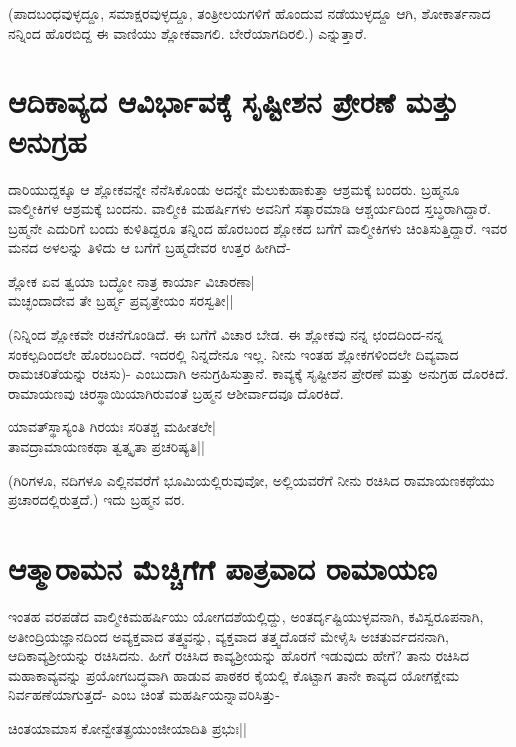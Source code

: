 (ಪಾದಬಂಧವುಳ್ಳದ್ದೂ, ಸಮಾಕ್ಷರವುಳ್ಳದ್ದೂ, ತಂತ್ರೀಲಯಗಳಿಗೆ ಹೊಂದುವ ನಡೆಯುಳ್ಳದ್ದೂ ಆಗಿ, ಶೋಕಾರ್ತನಾದ ನನ್ನಿಂದ ಹೊರಬಿದ್ದ ಈ ವಾಣಿಯು ಶ್ಲೋಕವಾಗಲಿ. ಬೇರೆಯಾಗದಿರಲಿ.) ಎನ್ನುತ್ತಾರೆ. 

\section*{ಆದಿಕಾವ್ಯದ ಆವಿರ್ಭಾವಕ್ಕೆ ಸೃಷ್ಟೀಶನ ಪ್ರೇರಣೆ ಮತ್ತು ಅನುಗ್ರಹ} 

ದಾರಿಯುದ್ದಕ್ಕೂ ಆ ಶ್ಲೋಕವನ್ನೇ ನೆನೆಸಿಕೊಂಡು ಅದನ್ನೇ ಮೆಲುಕುಹಾಕುತ್ತಾ ಆಶ್ರಮಕ್ಕೆ ಬಂದರು. ಬ್ರಹ್ಮನೂ ವಾಲ್ಮೀಕಿಗಳ ಆಶ್ರಮಕ್ಕೆ ಬಂದನು. ವಾಲ್ಮೀಕಿ ಮಹರ್ಷಿಗಳು ಅವನಿಗೆ ಸತ್ಕಾರಮಾಡಿ ಆಶ್ಚರ್ಯದಿಂದ ಸ್ತಬ್ಧರಾಗಿದ್ದಾರೆ. ಬ್ರಹ್ಮನೇ ಎದುರಿಗೆ ಬಂದು ಕುಳಿತಿದ್ದರೂ ತನ್ನಿಂದ ಹೊರಬಂದ ಶ್ಲೋಕದ ಬಗೆಗೆ ವಾಲ್ಮೀಕಿಗಳು ಚಿಂತಿಸುತ್ತಿದ್ದಾರೆ. ಇವರ ಮನದ ಅಳಲನ್ನು ತಿಳಿದು ಆ ಬಗೆಗೆ ಬ್ರಹ್ಮದೇವರ ಉತ್ತರ ಹೀಗಿದೆ- 

\begin{shloka} 
ಶ್ಲೋಕ ಏವ ತ್ವಯಾ ಬದ್ಧೋ ನಾತ್ರ ಕಾರ್ಯಾ ವಿಚಾರಣಾ|\\ 
ಮಚ್ಛಂದಾದೇವ ತೇ ಬ್ರರ್ಹ್ಮ ಪ್ರವೃತ್ತೇಯಂ ಸರಸ್ವತೀ||
\end{shloka} 

(ನಿನ್ನಿಂದ ಶ್ಲೋಕವೇ ರಚನೆಗೊಂಡಿದೆ. ಈ ಬಗೆಗೆ ವಿಚಾರ ಬೇಡ. ಈ ಶ್ಲೋಕವು ನನ್ನ ಛಂದದಿಂದ-ನನ್ನ ಸಂಕಲ್ಪದಿಂದಲೇ ಹೊರಬಂದಿದೆ. ಇದರಲ್ಲಿ ನಿನ್ನದೇನೂ ಇಲ್ಲ. ನೀನು ಇಂತಹ ಶ್ಲೋಕಗಳಿಂದಲೇ ದಿವ್ಯವಾದ ರಾಮಚರಿತೆಯನ್ನು ರಚಿಸು)- ಎಂಬುದಾಗಿ ಅನುಗ್ರಹಿಸುತ್ತಾನೆ. ಕಾವ್ಯಕ್ಕೆ ಸೃಷ್ಟೀಶನ ಪ್ರೇರಣೆ ಮತ್ತು ಅನುಗ್ರಹ ದೊರಕಿದೆ. ರಾಮಾಯಣವು ಚಿರಸ್ಥಾಯಿಯಾಗಿರುವಂತೆ ಬ್ರಹ್ಮನ ಆಶೀರ್ವಾದವೂ ದೊರಕಿದೆ. 

\begin{shloka} 
ಯಾವತ್‍ಸ್ಥಾಸ್ಯಂತಿ ಗಿರಯಃ ಸರಿತಶ್ಚ ಮಹೀತಲೇ|\\ 
ತಾವದ್ರಾಮಾಯಣಕಥಾ ತ್ವತ್ಕೃತಾ ಪ್ರಚರಿಷ್ಯತಿ||
\end{shloka} 

(ಗಿರಿಗಳೂ, ನದಿಗಳೂ ಎಲ್ಲಿನವರೆಗೆ ಭೂಮಿಯಲ್ಲಿರುವುವೋ, ಅಲ್ಲಿಯವರೆಗೆ ನೀನು ರಚಿಸಿದ ರಾಮಾಯಣಕಥೆಯು ಪ್ರಚಾರದಲ್ಲಿರುತ್ತದೆ.) ಇದು ಬ್ರಹ್ಮನ ವರ. 

\section*{ಆತ್ಮಾರಾಮನ ಮೆಚ್ಚಿಗೆಗೆ ಪಾತ್ರವಾದ ರಾಮಾಯಣ} 

ಇಂತಹ ವರಪಡೆದ ವಾಲ್ಮೀಕಿಮಹರ್ಷಿಯು ಯೋಗದಶೆಯಲ್ಲಿದ್ದು, ಅಂತರ್ದೃಷ್ಟಿಯುಳ್ಳವನಾಗಿ, ಕವಿಸ್ವರೂಪನಾಗಿ, ಅತೀಂದ್ರಿಯಜ್ಞಾನದಿಂದ ಅವ್ಯಕ್ತವಾದ ತತ್ತ್ವವನ್ನು, ವ್ಯಕ್ತವಾದ ತತ್ತ್ವದೊಡನೆ ಮೇಳೈಸಿ ಅಚತುರ್ವದನನಾಗಿ, ಆದಿಕಾವ್ಯಶ್ರೀಯನ್ನು ರಚಿಸಿದನು. ಹೀಗೆ ರಚಿಸಿದ ಕಾವ್ಯಶ್ರೀಯನ್ನು ಹೊರಗೆ ಇಡುವುದು ಹೇಗೆ? ತಾನು ರಚಿಸಿದ ಮಹಾಕಾವ್ಯವನ್ನು ಪ್ರಯೋಗಬದ್ಧವಾಗಿ ಹಾಡುವ ಪಾಠಕರ ಕೈಯಲ್ಲಿ ಕೊಟ್ಟಾಗ ತಾನೇ ಕಾವ್ಯದ ಯೋಗಕ್ಷೇಮ ನಿರ್ವಹಣೆಯಾಗುತ್ತದೆ- ಎಂಬ ಚಿಂತೆ ಮಹರ್ಷಿಯನ್ನಾವರಿಸಿತ್ತು- 

\begin{shloka} 
ಚಿಂತಯಾಮಾಸ ಕೋನ್ವೇತತ್ಪ್ರಯುಂಜೀಯಾದಿತಿ ಪ್ರಭುಃ||\label{158}
\end{shloka} 

